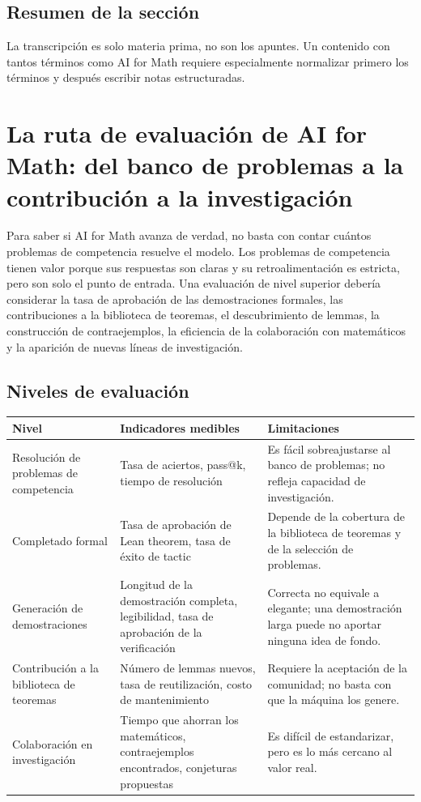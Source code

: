 \documentclass[a4paper]{article}
\begin{document}
\subsection{Resumen de la sección}

La transcripción es solo materia prima, no son los apuntes. Un contenido con tantos términos como AI for Math requiere especialmente normalizar primero los términos y después escribir notas estructuradas.
\section{La ruta de evaluación de AI for Math: del banco de problemas a la contribución a la investigación}

Para saber si AI for Math avanza de verdad, no basta con contar cuántos problemas de competencia resuelve el modelo. Los problemas de competencia tienen valor porque sus respuestas son claras y su retroalimentación es estricta, pero son solo el punto de entrada. Una evaluación de nivel superior debería considerar la tasa de aprobación de las demostraciones formales, las contribuciones a la biblioteca de teoremas, el descubrimiento de lemmas, la construcción de contraejemplos, la eficiencia de la colaboración con matemáticos y la aparición de nuevas líneas de investigación.

\subsection{Niveles de evaluación}

\noindent\begin{longtable}{p{}p{}p{}}
\toprule
Nivel & Indicadores medibles & Limitaciones \\
\midrule
Resolución de problemas de competencia & Tasa de aciertos, pass@k, tiempo de resolución & Es fácil sobreajustarse al banco de problemas; no refleja capacidad de investigación. \\
Completado formal & Tasa de aprobación de Lean theorem, tasa de éxito de tactic & Depende de la cobertura de la biblioteca de teoremas y de la selección de problemas. \\
Generación de demostraciones & Longitud de la demostración completa, legibilidad, tasa de aprobación de la verificación & Correcta no equivale a elegante; una demostración larga puede no aportar ninguna idea de fondo. \\
Contribución a la biblioteca de teoremas & Número de lemmas nuevos, tasa de reutilización, costo de mantenimiento & Requiere la aceptación de la comunidad; no basta con que la máquina los genere. \\
Colaboración en investigación & Tiempo que ahorran los matemáticos, contraejemplos encontrados, conjeturas propuestas & Es difícil de estandarizar, pero es lo más cercano al valor real. \\
\bottomrule
\end{longtable}
\end{document}
